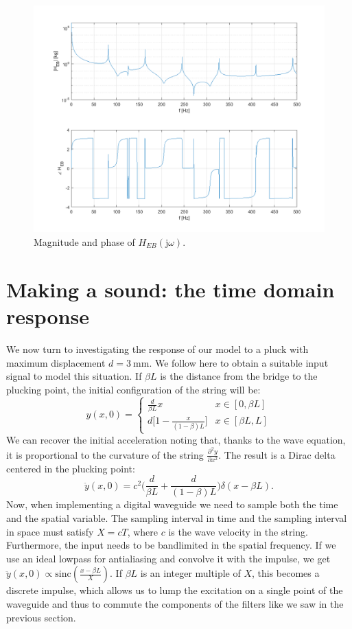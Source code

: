 \documentclass[a4paper]{article}
\begin{document}
\begin{figure}[h]
	\centering
	\includegraphics[width=0.75\linewidth]{heb.png}
	\caption{Magnitude and phase of $H_{EB}(\mathrm{j}\omega)$.}
	\label{fig:q2}
\end{figure}



\section{Making a sound: the time domain response}

We now turn to investigating the response of our model to a pluck with maximum displacement $d = \SI{3}{\milli\meter}$. We follow here \cite{smith92} to obtain a suitable input signal to model this situation. If $\beta L$ is the distance from the bridge to the plucking point, the initial configuration of the string will be:
$$ 
y(x, 0) = \left\{
	\begin{array}{lr}
		\frac{d}{\beta L}x & x \in [0, \beta L] \\[4pt]
		d \bigl[ 1 - \frac{x}{(1 - \beta) L} \bigr] & x \in [\beta L, L]
	\end{array}
\right.
$$
We can recover the initial acceleration noting that, thanks to the wave equation, it is proportional to the curvature of the string $\frac{\partial^2 y}{\partial x^2}$. The result is a Dirac delta centered in the plucking point:
$$
\ddot y(x, 0) = c^2 \biggl( \frac{d}{\beta L} + \frac{d}{(1 - \beta) L} \biggr) \delta(x - \beta L).
$$
Now, when implementing a digital waveguide we need to sample both the time and the spatial variable. The sampling interval in time and the sampling interval in space must satisfy $X = cT$, where $c$ is the wave velocity in the string. Furthermore, the input needs to be bandlimited in the spatial frequency. If we use an ideal lowpass for antialiasing and convolve it with the impulse, we get $\ddot y (x, 0) \propto \mathrm{sinc}\left( \frac{x-\beta L}{X} \right)$. If $\beta L$ is an integer multiple of $X$, this becomes a discrete impulse, which allows us to lump the excitation on a single point of the waveguide and thus to commute the components of the filters like we saw in the previous section.
\end{document}
